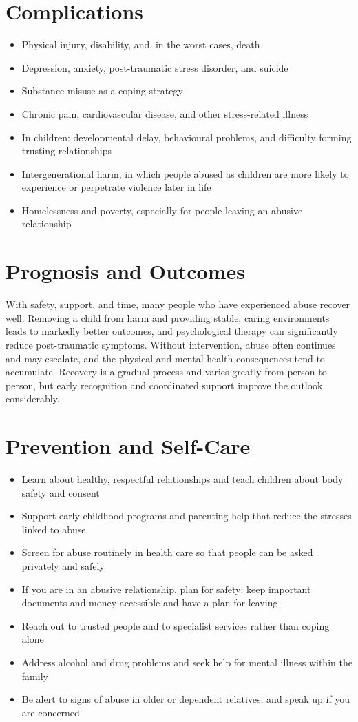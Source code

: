 \section*{Complications}
\begin{itemize}
    \item Physical injury, disability, and, in the worst cases, death
    \item Depression, anxiety, post-traumatic stress disorder, and suicide
    \item Substance misuse as a coping strategy
    \item Chronic pain, cardiovascular disease, and other stress-related illness
    \item In children: developmental delay, behavioural problems, and difficulty forming trusting relationships
    \item Intergenerational harm, in which people abused as children are more likely to experience or perpetrate violence later in life
    \item Homelessness and poverty, especially for people leaving an abusive relationship
\end{itemize}

\section*{Prognosis and Outcomes}
With safety, support, and time, many people who have experienced abuse recover well. Removing a child from harm and providing stable, caring environments leads to markedly better outcomes, and psychological therapy can significantly reduce post-traumatic symptoms. Without intervention, abuse often continues and may escalate, and the physical and mental health consequences tend to accumulate. Recovery is a gradual process and varies greatly from person to person, but early recognition and coordinated support improve the outlook considerably.

\section*{Prevention and Self-Care}
\begin{itemize}
    \item Learn about healthy, respectful relationships and teach children about body safety and consent
    \item Support early childhood programs and parenting help that reduce the stresses linked to abuse
    \item Screen for abuse routinely in health care so that people can be asked privately and safely
    \item If you are in an abusive relationship, plan for safety: keep important documents and money accessible and have a plan for leaving
    \item Reach out to trusted people and to specialist services rather than coping alone
    \item Address alcohol and drug problems and seek help for mental illness within the family
    \item Be alert to signs of abuse in older or dependent relatives, and speak up if you are concerned
\end{itemize}

